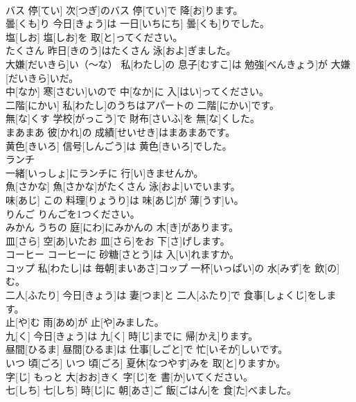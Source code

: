 \documentclass[8pt]{extreport}
\begin{document}
\begin{CJK}{UTF8}{min}
\\	バス 停[てい]	次[つぎ]のバス 停[てい]で 降[お]ります。		
\\	曇[くも]り	今日[きょう]は 一日[いちにち] 曇[くも]りでした。		
\\	塩[しお]	塩[しお]を 取[と]ってください。		
\\	たくさん	昨日[きのう]はたくさん 泳[およ]ぎました。		
\\	大嫌[だいきら]い（～な）	私[わたし]の 息子[むすこ]は 勉強[べんきょう]が 大嫌[だいきら]いだ。		
\\	中[なか]	寒[さむい]いので 中[なか]に 入[はい]ってください。		
\\	二階[にかい]	私[わたし]のうちはアパートの 二階[にかい]です。		
\\	無[な]くす	学校[がっこう]で 財布[さいふ]を 無[な]くした。		
\\	まあまあ	彼[かれ]の 成績[せいせき]はまあまあです。		
\\	黄色[きいろ]	信号[しんごう]は 黄色[きいろ]でした。		
\\	ランチ
\\	一緒[いっしょ]にランチに 行[い]きませんか。		
\\	魚[さかな]	魚[さかな]がたくさん 泳[およ]いでいます。		
\\	味[あじ]	この 料理[りょうり]は 味[あじ]が 薄[うす]い。		
\\	りんご	りんごを1つください。		
\\	みかん	うちの 庭[にわ]にみかんの 木[き]があります。		
\\	皿[さら]	空[あ]いたお 皿[さら]をお 下[さ]げします。		
\\	コーヒー	コーヒーに 砂糖[さとう]は 入[い]れますか。		
\\	コップ	私[わたし]は 毎朝[まいあさ]コップ 一杯[いっぱい]の 水[みず]を 飲[の]む。		
\\	二人[ふたり]	今日[きょう]は 妻[つま]と 二人[ふたり]で 食事[しょくじ]をします。		
\\	止[や]む	雨[あめ]が 止[や]みました。		
\\	九[く]	今日[きょう]は 九[く] 時[じ]までに 帰[かえ]ります。		
\\	昼間[ひるま]	昼間[ひるま]は 仕事[しごと]で 忙[いそが]しいです。		
\\	いつ 頃[ごろ]	いつ 頃[ごろ] 夏休[なつやす]みを 取[と]りますか。		
\\	字[じ]	もっと 大[おお]きく 字[じ]を 書[か]いてください。		
\\	七[しち]	七[しち] 時[じ]に 朝[あさ]ご 飯[ごはん]を 食[た]べました。		

\end{CJK}
\end{document}
